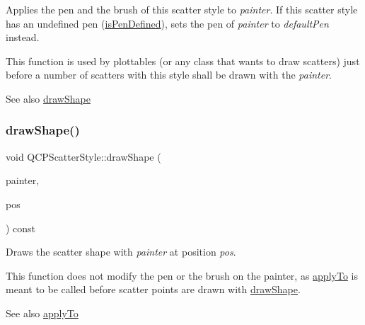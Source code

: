Applies the pen and the brush of this scatter style to {\itshape painter}. If this scatter style has an undefined pen (\mbox{\hyperlink{class_q_c_p_scatter_style_a47077eb6450fe9a788f833e4ec1b1d5a}{is\+Pen\+Defined}}), sets the pen of {\itshape painter} to {\itshape default\+Pen} instead.

This function is used by plottables (or any class that wants to draw scatters) just before a number of scatters with this style shall be drawn with the {\itshape painter}.

\begin{DoxySeeAlso}{See also}
\mbox{\hyperlink{class_q_c_p_scatter_style_a89b5105e6027bfcbfeefed9d201b607c}{draw\+Shape}} 
\end{DoxySeeAlso}
\mbox{\label{class_q_c_p_scatter_style_a89b5105e6027bfcbfeefed9d201b607c}} 
\subsubsection{\texorpdfstring{draw\+Shape()}{drawShape()}\hspace{0.1cm}{\footnotesize\ttfamily [1/2]}}
{\footnotesize\ttfamily void Q\+C\+P\+Scatter\+Style\+::draw\+Shape (\begin{DoxyParamCaption}\item[{\mbox{\hyperlink{class_q_c_p_painter}{Q\+C\+P\+Painter}} $\ast$}]{painter,  }\item[{const Q\+PointF \&}]{pos }\end{DoxyParamCaption}) const}

Draws the scatter shape with {\itshape painter} at position {\itshape pos}.

This function does not modify the pen or the brush on the painter, as \mbox{\hyperlink{class_q_c_p_scatter_style_afd8044ece445300499ca0dc164821e0f}{apply\+To}} is meant to be called before scatter points are drawn with \mbox{\hyperlink{class_q_c_p_scatter_style_a89b5105e6027bfcbfeefed9d201b607c}{draw\+Shape}}.

\begin{DoxySeeAlso}{See also}
\mbox{\hyperlink{class_q_c_p_scatter_style_afd8044ece445300499ca0dc164821e0f}{apply\+To}} 
\end{DoxySeeAlso}
\mbox{\label{class_q_c_p_scatter_style_a95c297b114c77c22428ef40f54620ddf}} 
